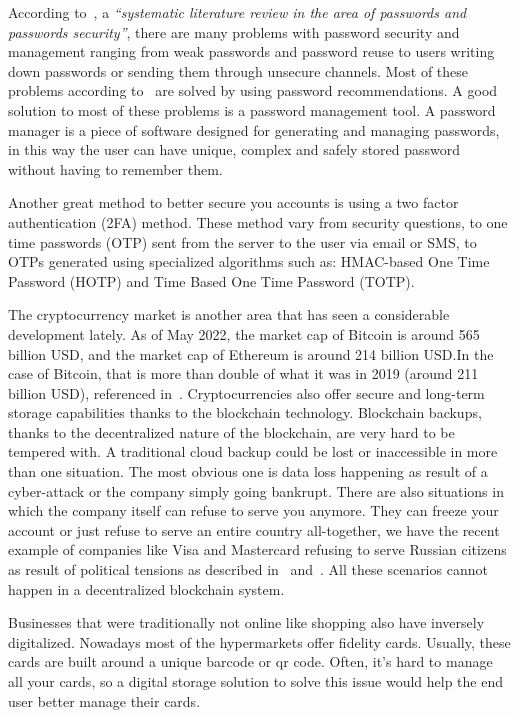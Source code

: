 \documentclass[a4paper,12pt]{report}
\begin{document}
According to~\cite{systematicAnalysis}, a \textit{``systematic literature
    review in the area of passwords and passwords security''}, there are many
problems with password security and management ranging from weak passwords and
password reuse to users writing down passwords or sending them through unsecure
channels. Most of these problems according to~\cite{systematicAnalysis} are
solved by using password recommendations. A good solution to most of these
problems is a password management tool. A password manager is a piece of
software designed for generating and managing passwords, in this way the user
can have unique, complex and safely stored password without having to remember
them.

Another great method to better secure you accounts is using a two factor
authentication (2FA) method. These method vary from security questions, to one
time passwords (OTP) sent from the server to the user via email or SMS, to OTPs
generated using specialized algorithms such as: HMAC-based One Time Password
(HOTP)\cite{hotp} and Time Based One Time Password (TOTP)\cite{totp}.

The cryptocurrency market is another area that has seen a considerable
development lately. As of May 2022, the market cap of Bitcoin is around 565
billion USD, and the market cap of Ethereum is around 214 billion USD.\@ In the
case of Bitcoin, that is more than double of what it was in 2019 (around 211
billion USD), referenced in~\cite{cryptocurrencyMarketAnalysis}.
Cryptocurrencies also offer secure and long-term storage capabilities thanks to
the blockchain technology. Blockchain backups, thanks to the decentralized
nature of the blockchain, are very hard to be tempered with. A traditional
cloud backup could be lost or inaccessible in more than one situation. The most
obvious one is data loss happening as result of a cyber-attack or the company
simply going bankrupt. There are also situations in which the company itself
can refuse to serve you anymore. They can freeze your account or just refuse to
serve an entire country all-together, we have the recent example of companies
like Visa and Mastercard refusing to serve Russian citizens as result of
political tensions as described in~\cite{russiaSanctions}
and~\cite{russiaSanctions2}. All these scenarios cannot happen in a
decentralized blockchain system.

Businesses that were traditionally not online like shopping also have inversely
digitalized. Nowadays most of the hypermarkets offer fidelity cards. Usually,
these cards are built around a unique barcode or qr code. Often, it's hard to
manage all your cards, so a digital storage solution to solve this issue would
help the end user better manage their cards.
\end{document}
